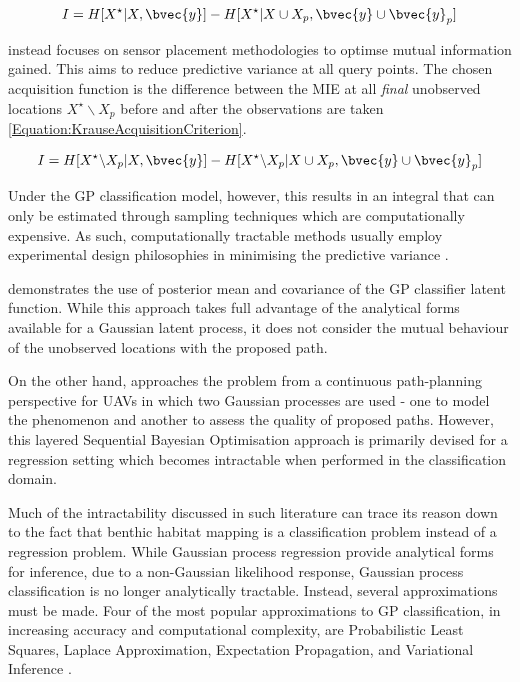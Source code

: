 		\begin{equation}
			I = H[X^{\star} | X, \bvec{y}] - H[X^{\star} | X \cup X_{p}, \bvec{y} \cup \bvec{y}_{p}]
		\label{Equation:AsherBenderMutualInformationCriterion}
		\end{equation}
		
		\cite{Krause:2008:NSP:1390681.1390689} instead focuses on sensor placement methodologies to optimse mutual information gained. This aims to reduce predictive variance at all query points. The chosen acquisition function is the difference between the MIE at all \textit{final} unobserved locations $X^{\star} \backslash X_{p}$ before and after the observations are taken \eqref{Equation:KrauseAcquisitionCriterion}.
		
		\begin{equation}
			I = H[X^{\star} \backslash X_{p} | X, \bvec{y}] - H[X^{\star} \backslash X_{p} | X \cup X_{p}, \bvec{y} \cup \bvec{y}_{p}]
		\label{Equation:KrauseAcquisitionCriterion}
		\end{equation}
		
		Under the GP classification model, however, this results in an integral that can only be estimated through sampling techniques which are computationally expensive. As such, computationally tractable methods usually employ experimental design philosophies in minimising the predictive variance \citep{AsherBender}.
		
		 demonstrates the use of posterior mean and covariance of the GP classifier latent function. While this approach takes full advantage of the analytical forms available for a Gaussian latent process, it does not consider the mutual behaviour of the unobserved locations with the proposed path.
		
		On the other hand, \cite{Roman:SequentialBayesianOptimisation} approaches the problem from a continuous path-planning perspective for UAVs in which two Gaussian processes are used - one to model the phenomenon and another to assess the quality of proposed paths. However, this layered Sequential Bayesian Optimisation approach is primarily devised for a regression setting which becomes intractable when performed in the classification domain.
		
		Much of the intractability discussed in such literature can trace its reason down to the fact that benthic habitat mapping is a classification problem instead of a regression problem. While Gaussian process regression provide analytical forms for inference, due to a non-Gaussian likelihood response, Gaussian process classification is no longer analytically tractable. Instead, several approximations must be made. Four of the most popular approximations to GP classification, in increasing accuracy and computational complexity, are Probabilistic Least Squares, Laplace Approximation, Expectation Propagation, and Variational Inference \citep{GaussianProcessForMachineLearning}.
		
